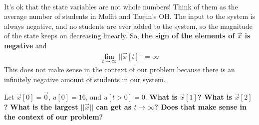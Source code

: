 \begin{enumerate}
{\begin{align*}
        \end{align*}
        It's ok that the state variables are not whole numbers! Think of them as the average number of students in Moffit and Taejin's OH.
        \newline
        The input to the system is always negative, and no students are ever added to the system, so the magnitude of the state keeps on decreasing linearly. So, \textbf{the sign of the elements of $\vec{x}$ is negative} and
        \begin{align*}
            \lim_{t \to \infty} ||\vec{x}[t]|| = \infty
        \end{align*}
        This does not make sense in the context of our problem because there is an infinitely negative amount of students in our system.
    }

    \ws{\vspace{12cm}}
    \qitem Let $\vec{x}[0] = \vec{0}$, $u[0] = 16$, and $u[t>0] = 0$. \textbf{What is $\vec{x}[1]$? What is $\vec{x}[2]$?} \textbf{What is the largest $||\vec{x}||$ can get as $t\rightarrow\infty$? Does that make sense in the context of our problem?}

\end{enumerate}
